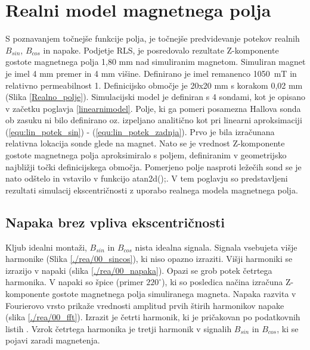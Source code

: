 \chapter{Realni model magnetnega polja}
S poznavanjem točnejše funkcije polja, je točnejše predvidevanje potekov realnih $B_{sin}$, $B_{cos}$ in napake. Podjetje RLS,  je posredovalo rezultate Z-komponente gostote magnetnega polja 1,80 mm nad simuliranim magnetom. Simuliran magnet je imel 4 mm premer in 4 mm višine. Definirano je imel remanenco 1050~mT in relativno permeabilnost 1.  Definicijsko območje  je 20x20 mm s korakom 0,02 mm (Slika \ref{Realno_polje}).
Simulacijski model je definiran s 4 sondami, kot je opisano v začetku poglavja \ref{linearnimodel}.
Polje, ki ga pomeri posamezna Hallova sonda ob zasuku ni bilo definirano oz. izpeljano analitično kot pri linearni aproksimaciji (\ref{equ:lin_potek_sin}) - (\ref{equ:lin_potek_zadnja}).  Prvo je bila izračunana relativna lokacija sonde glede na magnet. Nato se je vrednost Z-komponente gostote magnetnega polja  aproksimiralo s poljem, definiranim v geometrijsko najbližji točki definicijskega območja.
Pomerjeno polje nasproti ležečih sond se je nato odštelo in vstavilo v funkcijo atan2d();.
V tem poglavju so predstavljeni rezultati simulacij ekscentričnosti z uporabo realnega modela magnetnega polja.
\section{Napaka brez vpliva ekscentričnosti}
Kljub idealni montaži, $B_{sin}$ in $B_{cos}$ nista idealna signala.  Signala vsebujeta višje harmonike (Slika \ref{./rea/00_sincos}), ki niso opazno izraziti. Višji harmoniki se izrazijo v napaki (slika \ref{./rea/00_napaka}). Opazi se grob potek četrtega harmonika. V napaki so špice (primer $220^{\circ}$), ki so posledica načina izračuna Z-komponente gostote  magnetnega polja simuliranega magneta. Napaka razvita v Fourierovo vrsto prikaže vrednosti amplitud prvih štirih harmonikov napake (slika \ref{./rea/00_fft}). Izrazit je četrti harmonik, ki je pričakovan po podatkovnih listih \cite{AM8192}. Vzrok četrtega harmonika je tretji harmonik v signalih  $B_{sin}$ in $B_{cos}$, ki se pojavi zaradi magnetenja.
\newpage
